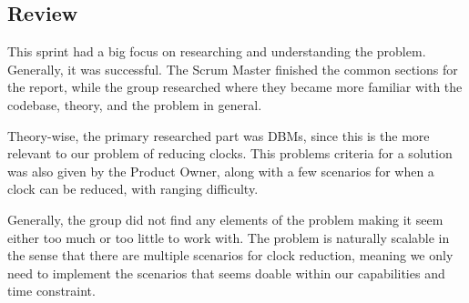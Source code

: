 \subsection{Review}
This sprint had a big focus on researching and understanding the problem. Generally, it was successful. The Scrum Master finished the common sections for the report, while the group researched where they became more familiar with the codebase, theory, and the problem in general.

Theory-wise, the primary researched part was DBMs, since this is the more relevant to our problem of reducing clocks. This problems criteria for a solution was also given by the Product Owner, along with a few scenarios for when a clock can be reduced, with ranging difficulty.

Generally, the group did not find any elements of the problem making it seem either too much or too little to work with. The problem is naturally scalable in the sense that there are multiple scenarios for clock reduction, meaning we only need to implement the scenarios that seems doable within our capabilities and time constraint.











\iffalse
Mangler:
Omskriv model checking. BALINGO
Skriv om transition systems. Magnus
Define what a specification is. Magnus
Beslut om der er skrevet nok til dbm. Simon
Få review fra Martijn implementeret. Kira
Review. Loppe
\fi